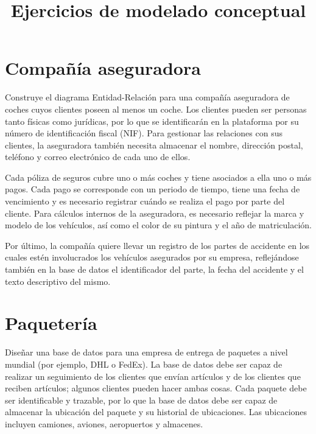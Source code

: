 \documentclass{db-practice}
\begin{document}
\title{Ejercicios de modelado conceptual}

\section{Compañía aseguradora}
Construye el diagrama Entidad-Relación para una compañía aseguradora de coches cuyos clientes poseen al menos un coche. Los clientes pueden ser personas tanto físicas como jurídicas, por lo que se identificarán en la plataforma por su número de identificación fiscal (NIF). Para gestionar las relaciones con sus clientes, la aseguradora también necesita almacenar el nombre, dirección postal, teléfono y correo electrónico de cada uno de ellos.

Cada póliza de seguros cubre uno o más coches y tiene asociados a ella uno o más pagos. Cada pago se corresponde con un periodo de tiempo, tiene una fecha de vencimiento y es necesario registrar cuándo se realiza el pago por parte del cliente. Para cálculos internos de la aseguradora, es necesario reflejar la marca y modelo de los vehículos, así como el color de su pintura y el año de matriculación.

Por último, la compañía quiere llevar un registro de los partes de accidente en los cuales estén involucrados los vehículos asegurados por su empresa, reflejándose también en la base de datos el identificador del parte, la fecha del accidente y el texto descriptivo del mismo.

\section{Paquetería}
Diseñar una base de datos para una empresa de entrega de paquetes a nivel mundial (por ejemplo, DHL o FedEx). La base de datos debe ser capaz de realizar un seguimiento de los clientes que envían artículos y de los clientes que reciben artículos; algunos clientes pueden hacer ambas cosas. Cada paquete debe ser identificable y trazable, por lo que la base de datos debe ser capaz de almacenar la ubicación del paquete y su historial de ubicaciones. Las ubicaciones incluyen camiones, aviones, aeropuertos y almacenes.
\end{document}
